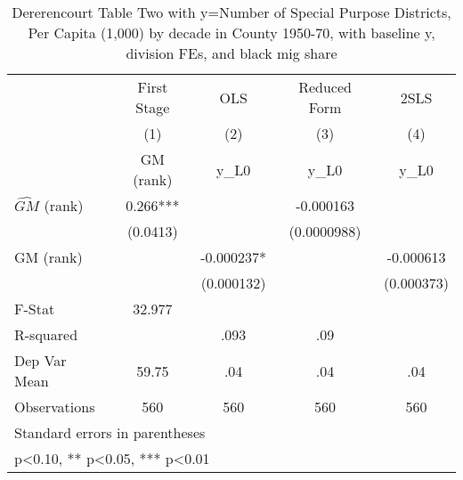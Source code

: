\begin{table}[htbp]\centering
\def\sym#1{\ifmmode^{#1}\else\(^{#1}\)\fi}
\caption{Dererencourt Table Two with y=Number of Special Purpose Districts, Per Capita (1,000) by decade in County 1950-70, with baseline y, division FEs, and black mig share}
\begin{tabular}{l*{4}{c}}
\toprule
                    & First Stage   &         OLS   &Reduced Form   &        2SLS   \\
                    &\multicolumn{1}{c}{(1)}&\multicolumn{1}{c}{(2)}&\multicolumn{1}{c}{(3)}&\multicolumn{1}{c}{(4)}\\
                    &\multicolumn{1}{c}{GM  (rank)}&\multicolumn{1}{c}{y\_L0}&\multicolumn{1}{c}{y\_L0}&\multicolumn{1}{c}{y\_L0}\\
\midrule
$\hat{GM}$ (rank)   &       0.266***&               &   -0.000163   &               \\
                    &    (0.0413)   &               & (0.0000988)   &               \\
\addlinespace
GM  (rank)          &               &   -0.000237*  &               &   -0.000613   \\
                    &               &  (0.000132)   &               &  (0.000373)   \\
\midrule
F-Stat              &      32.977   &               &               &               \\
R-squared           &               &        .093   &         .09   &               \\
Dep Var Mean        &       59.75   &         .04   &         .04   &         .04   \\
Observations        &         560   &         560   &         560   &         560   \\
\bottomrule
\multicolumn{5}{l}{\footnotesize Standard errors in parentheses}\\
\multicolumn{5}{l}{\footnotesize * p<0.10, ** p<0.05, *** p<0.01}\\
\end{tabular}
\end{table}
